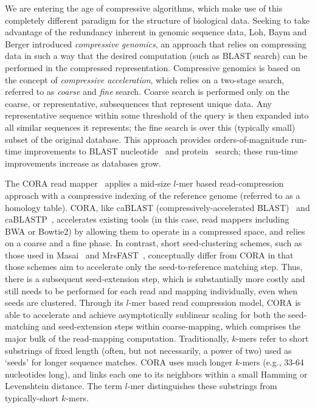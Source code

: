 \documentclass{acm_proc_article-sp}
\begin{document}
We are entering the age of compressive algorithms, 
which make use of this completely different paradigm for the structure of biological data.
Seeking to take advantage of the redundancy inherent in genomic sequence data, 
Loh, Baym and Berger \cite{loh2012compressive}
introduced \emph{compressive genomics}, an approach that relies on compressing
data in such a way that the desired computation (such as BLAST search) can be
performed in the compressed representation.
Compressive genomics is based on the concept of \emph{compressive acceleration},
which relies on a two-stage search, referred to as \emph{coarse} and \emph{fine} search.
Coarse search is performed only on the coarse, or representative, subsequences
that represent unique data.
Any representative sequence within some threshold of the query is then expanded 
into all similar sequences it represents; the fine search is over this
(typically small) subset of the original database.
This approach provides orders-of-magnitude run-time improvements to BLAST 
nucleotide~\cite{loh2012compressive} and protein~\cite{daniels2013compressive}
search; these run-time improvements increase as databases grow.

The CORA read mapper~\cite{yorukoglu2015compressive} applies a mid-size $l$-mer based 
read-compression approach with a compressive indexing of the reference genome
(referred to as a homology table).
CORA, like caBLAST (compressively-accelerated BLAST)~\cite{loh2012compressive} and 
caBLASTP~\cite{daniels2013compressive}, accelerates existing tools (in this 
case, read
mappers including BWA or Bowtie2) by allowing them to operate in a compressed
space, and relies on a coarse and a fine phase.
In contrast, short seed-clustering schemes, such as those used in Masai~\cite{siragusa2013fast} and 
MrsFAST~\cite{berger2013computational}, conceptually differ from CORA in that those 
schemes aim to accelerate only the seed-to-reference matching step.
Thus, there is a subsequent seed-extension step, which is substantially more 
costly and still needs to be performed for each read and mapping individually, 
even when seeds are clustered. 
Through its $l$-mer based read compression model, CORA is able to accelerate 
and 
achieve asymptotically sublinear scaling for both the seed-matching and 
seed-extension steps within coarse-mapping, which comprises the major bulk of 
the read-mapping computation.
Traditionally, $k$-mers refer to short substrings of fixed length (often, but 
not necessarily, a power of two) used as `seeds' for longer sequence matches.
CORA uses much longer $k$-mers (e.g., 33-64 nucleotides long), and links each 
one to its neighbors within a small Hamming or Levenshtein distance.
The term $l$-mer distinguishes these substrings from typically-short $k$-mers.
\end{document}
